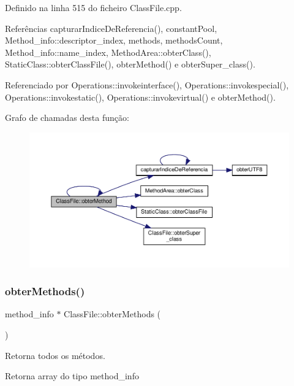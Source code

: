 Definido na linha 515 do ficheiro Class\+File.\+cpp.



Referências capturar\+Indice\+De\+Referencia(), constant\+Pool, Method\+\_\+info\+::descriptor\+\_\+index, methods, methods\+Count, Method\+\_\+info\+::name\+\_\+index, Method\+Area\+::obter\+Class(), Static\+Class\+::obter\+Class\+File(), obter\+Method() e obter\+Super\+\_\+class().



Referenciado por Operations\+::invokeinterface(), Operations\+::invokespecial(), Operations\+::invokestatic(), Operations\+::invokevirtual() e obter\+Method().

Grafo de chamadas desta função\+:
\nopagebreak
\begin{figure}[H]
\begin{center}
\leavevmode
\includegraphics[width=350pt]{classClassFile_aac49e7e39f677987b53fdf15787b8106_cgraph}
\end{center}
\end{figure}
\mbox{\label{classClassFile_a6ecce8d87f74c84b07f102c0298de13a}} 
\subsubsection{\texorpdfstring{obter\+Methods()}{obterMethods()}}
{\footnotesize\ttfamily method\+\_\+info $\ast$ Class\+File\+::obter\+Methods (\begin{DoxyParamCaption}{ }\end{DoxyParamCaption})}



Retorna todos os métodos. 

\begin{DoxyReturn}{Retorna}
array do tipo method\+\_\+info 
\end{DoxyReturn}


